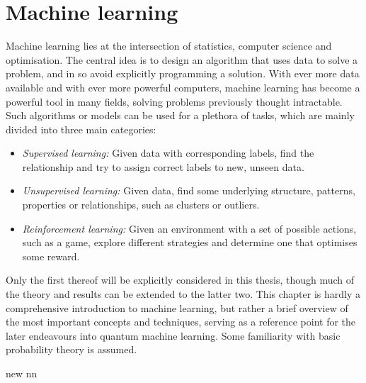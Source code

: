 \chapter{Machine learning}
\label{chap:ml}

Machine learning lies at the intersection of statistics, computer science and optimisation.
The central idea is to design an algorithm that uses data to solve a problem, and in so avoid explicitly programming a solution.
With ever more data available and with ever more powerful computers, machine learning has become a powerful tool in many fields, solving problems previously thought intractable.
Such algorithms or models can be used for a plethora of tasks, which are mainly divided into three main categories:
\begin{itemize}

      \item
            \textit{Supervised learning:} Given data with corresponding labels, find the relationship and try to assign correct labels to new, unseen data.

      \item
            \textit{Unsupervised learning:} Given data, find some underlying structure, patterns, properties or relationships, such as clusters or outliers.

      \item
            \textit{Reinforcement learning:} Given an environment with a set of possible actions, such as a game, explore different strategies and determine one that optimises some reward.

\end{itemize}
Only the first thereof will be explicitly considered in this thesis, though much of the theory and results can be extended to the latter two.
This chapter is hardly a comprehensive introduction to machine learning, but rather a brief overview of the most important concepts and techniques, serving as a reference point for the later endeavours into quantum machine learning.
Some familiarity with basic probability theory is assumed.

{new}
{nn}